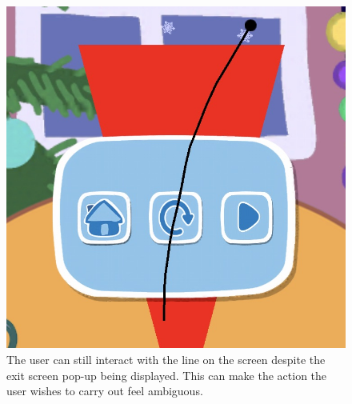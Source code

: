 \documentclass[11pt]{article}
\begin{document}
                \begin{figure}[!ht]
                        \begin{minipage}{0.32\textwidth}
                            \centering \includegraphics[width=0.8\linewidth]{Images/peppa/peppaGlitchLine}
                            \caption{The user can still interact with the line on the screen despite the exit screen pop-up being displayed. This can make the action the user wishes to carry out feel ambiguous.}
                            \label{fig:peppaGlitchLine}
                        \end{minipage}
                        \begin{minipage}{0.32\textwidth}
                            \centering

\end{minipage}
\end{figure}
\end{document}
